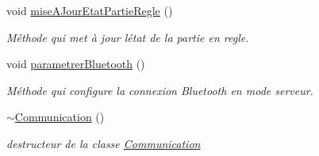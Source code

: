 \begin{DoxyCompactItemize}
void \hyperlink{class_communication_a01a86890468a8ecfb900bf15dcab92f2}{mise\+A\+Jour\+Etat\+Partie\+Regle} ()
\begin{DoxyCompactList}\small\item\em Méthode qui met à jour l\textquotesingle{}état de la partie en regle. \end{DoxyCompactList}\item 
void \hyperlink{class_communication_abe2349c8e1d9536a73c8741425ba867f}{parametrer\+Bluetooth} ()
\begin{DoxyCompactList}\small\item\em Méthode qui configure la connexion Bluetooth en mode serveur. \end{DoxyCompactList}\item 
\hyperlink{class_communication_a75ba08ce908d45251e28e4c1db94e6f4}{$\sim$\+Communication} ()
\begin{DoxyCompactList}\small\item\em destructeur de la classe \hyperlink{class_communication}{Communication} \end{DoxyCompactList}\end{DoxyCompactItemize}
